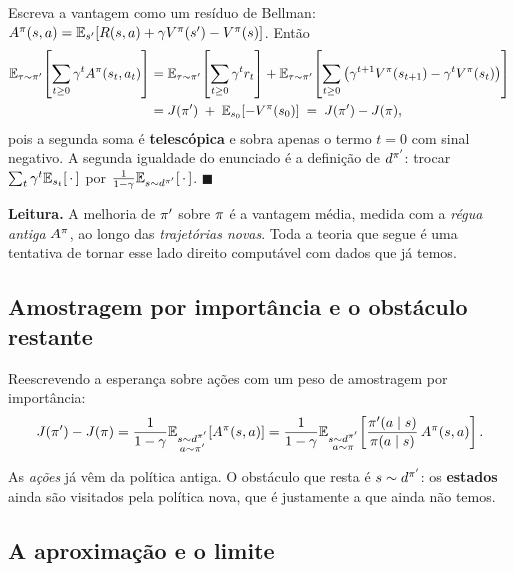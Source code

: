 \documentclass[11pt, a4paper]{article}
\newcommand{\Adv}{A}
\newcommand{\polnovo}{\pol'}
\newcommand{\dpolnovo}{d^{\pol'}}
\begin{document}
\begin{provabox}
Escreva a vantagem como um resíduo de Bellman:
$\Adv^{\pol}(s,a) = \E_{s'}\!\left[\rec(s,a) + \gamma \Vpi(s') - \Vpi(s)\right]$.
Então
\begin{align*}
  \E_{\tau\sim\polnovo}\!\left[\sum_{t\ge 0}\gamma^t \Adv^{\pol}(s_t,a_t)\right]
  &= \E_{\tau\sim\polnovo}\!\left[\sum_{t\ge 0}\gamma^t r_t\right]
   + \E_{\tau\sim\polnovo}\!\left[\sum_{t\ge 0}
     \left(\gamma^{t+1}\Vpi(s_{t+1}) - \gamma^{t}\Vpi(s_t)\right)\right] \\
  &= J(\polnovo) \;+\; \E_{s_0}\!\left[-\Vpi(s_0)\right]
   \;=\; J(\polnovo) - J(\pol),
\end{align*}
pois a segunda soma é \textbf{telescópica} e sobra apenas o termo $t=0$ com
sinal negativo. A segunda igualdade do enunciado é a definição de $\dpolnovo$:
trocar $\sum_t \gamma^t \mathbb{E}_{s_t}[\,\cdot\,]$ por
$\frac{1}{1-\gamma}\E_{s\sim\dpolnovo}[\,\cdot\,]$. \hfill$\blacksquare$
\end{provabox}

\begin{ideiabox}
\textbf{Leitura.} A melhoria de $\polnovo$ sobre $\pi$ é a vantagem média,
medida com a \emph{régua antiga} $\Adv^{\pol}$, ao longo das \emph{trajetórias
novas}. Toda a teoria que segue é uma tentativa de tornar esse lado direito
computável com dados que já temos.
\end{ideiabox}

\subsection{Amostragem por importância e o obstáculo restante}

Reescrevendo a esperança sobre ações com um peso de amostragem por importância:
\[
  J(\polnovo) - J(\pol)
  = \frac{1}{1-\gamma}\E_{\substack{s\sim\dpolnovo\\ a\sim\polnovo}}\!\left[\Adv^{\pol}(s,a)\right]
  = \frac{1}{1-\gamma}\E_{\substack{s\sim\dpolnovo\\ a\sim\pol}}
    \!\left[\frac{\polnovo(a\mid s)}{\pol(a\mid s)}\,\Adv^{\pol}(s,a)\right].
\]

As \emph{ações} já vêm da política antiga. O obstáculo que resta é
$s \sim \dpolnovo$: os \textbf{estados} ainda são visitados pela política nova,
que é justamente a que ainda não temos.

\subsection{A aproximação e o limite}
\end{document}
